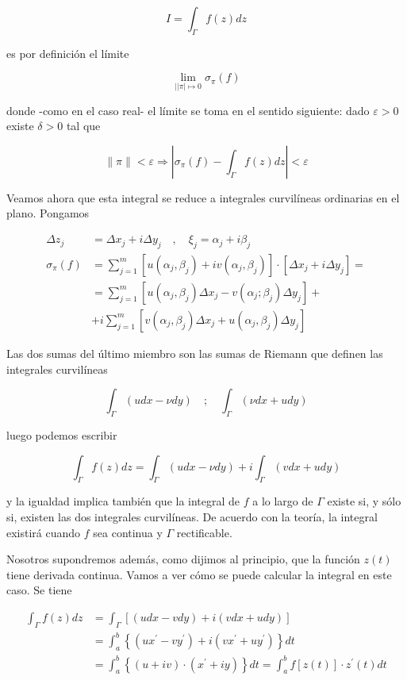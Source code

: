 \documentclass[10pt]{article}
\theoremstyle{plain}
\theoremstyle{definition}
\theoremstyle{remark}
\begin{document}
$$
I=\int_{\Gamma} f(z) d z
$$

es por definición el límite

$$
\lim _{||\pi| \mapsto 0} \sigma_{\pi}(f)
$$

donde -como en el caso real- el límite se toma en el sentido siguiente: dado $\varepsilon>0$ existe $\delta>0$ tal que

$$
\|\pi\|<\varepsilon \Rightarrow\left|\sigma_{\pi}(f)-\int_{\Gamma} f(z) d z\right|<\varepsilon
$$

Veamos ahora que esta integral se reduce a integrales curvilíneas ordinarias en el plano. Pongamos

$$
\begin{aligned}
\Delta z_{j} & =\Delta x_{j}+i \Delta y_{j} \quad, \quad \xi_{j}=\alpha_{j}+i \beta_{j} \\
\sigma_{\pi}(f) & =\sum_{j=1}^{m}\left[u\left(\alpha_{j}, \beta_{j}\right)+i v\left(\alpha_{j}, \beta_{j}\right)\right] \cdot\left[\Delta x_{j}+i \Delta y_{j}\right]= \\
& =\sum_{j=1}^{m}\left[u\left(\alpha_{j}, \beta_{j}\right) \Delta x_{j}-v\left(\alpha_{j} ; \beta_{j}\right) \Delta y_{j}\right]+ \\
& +i \sum_{j=1}^{m}\left[v\left(\alpha_{j}, \beta_{j}\right) \Delta x_{j}+u\left(\alpha_{j}, \beta_{j}\right) \Delta y_{j}\right]
\end{aligned}
$$


Las dos sumas del último miembro son las sumas de Riemann que definen las integrales curvilíneas

$$
\int_{\Gamma}(u d x-\nu d y) \quad ; \quad \int_{\Gamma}(\nu d x+u d y)
$$

luego podemos escribir


\begin{equation*}
\int_{\Gamma} f(z) d z=\int_{\Gamma}(u d x-\nu d y)+i \int_{\Gamma}(v d x+u d y) \tag{41}
\end{equation*}


y la igualdad implica también que la integral de $f$ a lo largo de $\Gamma$ existe si, y sólo si, existen las dos integrales curvilíneas. De acuerdo con la teoría, la integral existirá cuando $f$ sea continua y $\Gamma$ rectificable.

Nosotros supondremos además, como dijimos al principio, que la función $z(t)$ tiene derivada continua. Vamos a ver cómo se puede calcular la integral en este caso. Se tiene

$$
\begin{aligned}
\int_{\Gamma} f(z) d z & =\int_{\Gamma}[(u d x-v d y)+i(v d x+u d y)] \\
& =\int_{a}^{b}\left\{\left(u x^{\prime}-v y^{\prime}\right)+i\left(v x^{\prime}+u y^{\prime}\right)\right\} d t \\
& =\int_{a}^{b}\left\{(u+i v) \cdot\left(x^{\prime}+i y\right)\right\} d t=\int_{a}^{b} f[z(t)] \cdot z^{\prime}(t) d t
\end{aligned}
$$
\end{document}
